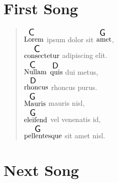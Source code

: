 \documentclass[twocolumn]{article}
\newcommand{\ch}[2]{$\overset{ \resizebox{0.3cm}{!}{\textsf{#2}} }{\text{#1}}$}
\begin{document}
\section*{First Song}

\begin{verse}

\ch{Lorem}{C} ipsum dolor sit \ch{amet}{G}, \\
\ch{consectetur}{C} adipiscing elit.\\
\ch{Nullam}{C} \ch{quis}{D} dui metus, \\
\ch{rhoncus}{D} rhoncus purus. \\
\ch{Mauris}{G} mauris nisl, \\
\ch{eleifend}{G} vel venenatis id, \\
\ch{pellentesque}{G} sit amet nisl.

\end{verse}

\section*{Next Song}
\end{document}
